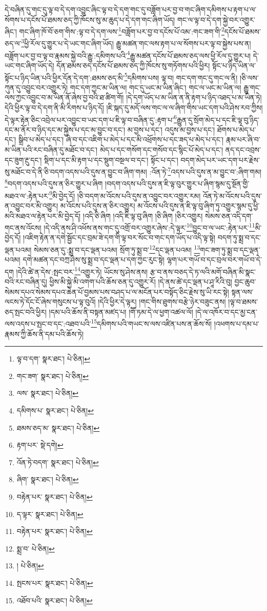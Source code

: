 དེ་བཞིན་དུ་གང་དུ་ལྟ་བ་དེ་དག་འབྱུང་ཞིང་ལྟ་བ་དེ་དག་གང་དུ་བཟློག་པར་བྱ་བ་གང་ཞིག་དམིགས་པ་རྟག་པ་ལ་སོགས་པ་དངོས་པོ་ཐམས་ཅད་ཀྱི་ཁོངས་སུ་མ་ཆུད་པ་དེ་དག་གང་ཞིག་ཡོད། གང་ལ་ལྟ་བ་དེ་དག་སྐྱེ་བར་འགྱུར་ཞིང་། གང་ཞིག་ཁོ་བོ་ཅག་གིས་:ལྟ་བ་དེ་དག་ལས་\footnote{ལྟ་བ་དག་  སྣར་ཐང་།  པེ་ཅིན། }བཟློག་པར་བྱ་བ་དངོས་པོ་འམ་:གང་ཟག་གི་\footnote{གང་ཟག་  སྣར་ཐང་།  པེ་ཅིན། }དངོས་པོ་ཐམས་ཅད་ལ་\footnote{ལས་  སྣར་ཐང་།  པེ་ཅིན། }ཕྱི་རོལ་དུ་གྱུར་པ་དེ་ཡང་གང་ཞིག་ཡོད། རྒྱུ་མཚན་གང་ལས་རྟག་པ་ལ་སོགས་པར་ལྟ་བ་སྐྱེས་པས་ན། བཟློག་པར་བྱ་བ་ལྟ་བ་རྣམས་སྐྱེ་བའི་རྒྱུ་:དམིགས་པའི་\footnote{དམིགས་པ་  སྣར་ཐང་།  པེ་ཅིན། }རྒྱུ་མཚན་དངོས་པོ་ཐམས་ཅད་ལས་ཕྱི་རོལ་དུ་གྱུར་པ། དེ་ཡང་གང་ཞིག་ཡོད་དེ། དོན་ཐམས་ཅད་དངོས་པོ་ཐམས་ཅད་ཀྱི་ཁོངས་སུ་གཏོགས་པའི་ཕྱིར། སྟོང་པ་ཉིད་ཡིན་ལ་སྟོང་པ་ཉིད་ཡིན་པའི་ཕྱིར་དོན་དེ་དག་:ཐམས་ཅད་མི་\footnote{ཐམས་ཅད་མ་  སྣར་ཐང་།  པེ་ཅིན། }དམིགས་པས། ལྟ་བ། གང་དག་གང་དུ་གང་ལ་ནི། །ཅི་ལས་ཀུན་དུ་འབྱུང་བར་འགྱུར་ཏེ། གང་དག་ཀྱང་མ་ཡིན་ལ། གང་དུ་ཡང་མ་ཡིན་ཞིང་། གང་ལ་ཡང་མ་ཡིན་ལ། རྒྱུ་གང་ལས་ཀྱང་འབྱུང་བ་མ་ཡིན་ནོ་ཞེས་བྱ་བའི་ཐ་ཚིག་གོ། །དེ་དག་ཡོད་པ་མ་ཡིན་ན་ནི་རྟག་པ་ཉིད་འཐད་པ་མ་ཡིན་ཏེ། དེའི་ཕྱིར་ལྟ་བ་དེ་དག་ནི་མི་རིགས་པ་ཉིད་དོ། །ཇི་སྐད་དུ་མདོ་ལས་གང་ལ་ལ་ཞིག་གིས་ཡང་དག་པའི་ཤེས་རབ་ཀྱིས། དེ་ལྟར་རྟེན་ཅིང་འབྲེལ་པར་འབྱུང་བ་ཡང་དག་པ་ཇི་ལྟ་བ་བཞིན་དུ་:རྟག་པ་\footnote{རྟག་པར་  སྡེ་དགེ། }རྒྱུན་དུ་སྲོག་མེད་པ་དང་ཇི་ལྟ་བུ་ཉིད་དང་མ་ནོར་བ་ཉིད་དང་མ་སྐྱེས་པ་དང་མ་བྱུང་བ་དང་། མ་བྱས་པ་དང་། འདུས་མ་བྱས་པ་དང་། ཐོགས་པ་མེད་པ་དང་། སྒྲིབ་པ་མེད་པ་དང་། ཞི་བ་དང་འཇིག་པ་མེད་པ་དང་མི་འཕྲོགས་པ་དང་ཟད་པ་མེད་པ་དང་། རྣམ་པར་ཞི་བ་མ་ཡིན་པའི་རང་བཞིན་དུ་མཐོང་བ་དང་། མེད་པ་དང་གསོག་དང་གསོབ་དང་སྙིང་པོ་མེད་པ་དང་། ནད་དང་འབྲས་དང་ཟུག་རྔུ་དང་། སྡིག་པ་དང་མི་རྟག་པ་དང་སྡུག་བསྔལ་བ་དང་། སྟོང་པ་དང་། བདག་མེད་པར་ཡང་དག་པར་རྗེས་སུ་མཐོང་བ་དེ་ནི་ཅི་བདག་འདས་པའི་དུས་ན་བྱུང་བ་ཞིག་གམ། :འོན་ཏེ་\footnote{འོན་ཏེ་བདག་  སྣར་ཐང་།  པེ་ཅིན། }འདས་པའི་དུས་ན་མ་བྱུང་བ་:ཞིག་གམ། \footnote{ཞིག་  སྣར་ཐང་།  པེ་ཅིན། }བདག་འདས་པའི་དུས་ན་ཅིར་གྱུར་པ་ཞིག །བདག་འདས་པའི་དུས་ན་ཇི་ལྟ་བུར་གྱུར་པ་ཞིག་སྙམ་དུ་སྔོན་གྱི་མཐའ་ལ་:རྟེན་པར་\footnote{བརྟེན་པར་  སྣར་ཐང་།  པེ་ཅིན། }མི་བྱེད་དོ། །ཅི་བདག་མ་འོངས་པའི་དུས་ན་འབྱུང་བར་འགྱུར་རམ། འོན་ཏེ་མ་འོངས་པའི་དུས་ན་འབྱུང་བར་མི་འགྱུར། མ་འོངས་པའི་དུས་ན་ཅིར་འགྱུར། མ་འོངས་པའི་དུས་ན་ཇི་ལྟ་བུ་ཞིག་ཏུ་འགྱུར་སྙམ་དུ་ཕྱི་མའི་མཐའ་ལ་རྟེན་པར་མི་བྱེད་དོ། །འདི་ཅི་ཞིག །འདི་ཇི་ལྟ་བུ་ཞིག །ཅི་ཞིག །ཅིར་འགྱུར། སེམས་ཅན་འདི་དག་གང་ནས་འོངས། །དེ་འདི་ནས་ཤི་འཕོས་ནས་གང་དུ་འགྲོ་བར་འགྱུར་ཞེས་:དེ་ལྟར་\footnote{ད་ལྟར་  སྣར་ཐང་།  པེ་ཅིན། }བྱུང་བ་ལ་ཡང་:རྟེན་པར་\footnote{བརྟེན་པར་  སྣར་ཐང་།  པེ་ཅིན། }མི་བྱེད་དོ། །འཇིག་རྟེན་ན་དགེ་སྦྱོང་དང་བྲམ་ཟེ་དག་གི་ལྟ་བར་སོང་བ་གང་དག་ཡོད་པ་འདི་ལྟ་སྟེ། བདག་ཏུ་སྨྲ་བ་དང་ལྡན་པའམ། སེམས་ཅན་དུ་:སྨྲ་བ་དང་ལྡན་པའམ། སྲོག་ཏུ་སྨྲ་བ་\footnote{སྨྲ་བ་  པེ་ཅིན། }དང་ལྡན་པའམ། \footnote{།    པེ་ཅིན། }གང་ཟག་ཏུ་སྨྲ་བ་དང་ལྡན་པའམ། དགེ་མཚན་དང་བཀྲ་ཤིས་སུ་སྨྲ་བ་དང་ལྡན་པ་དག་ཀྱང་རུང་སྟེ། ལྷག་པར་གཡོ་བ་དང་བྲལ་བར་གཡོ་བ་དེ་དག །དེའི་ཚེ་ན་དེས་:སྤང་བར་\footnote{སྤངས་པར་  སྣར་ཐང་།  པེ་ཅིན། }འགྱུར་ཏེ། ཡོངས་སུ་ཤེས་ནས། རྩ་བ་ནས་བཅད་དེ་ཏ་ལའི་མགོ་བཞིན་མི་སྣང་བའི་རང་བཞིན་དུ། ཕྱིས་མི་སྐྱེ་མི་འགག་པའི་ཆོས་ཅན་དུ་འགྱུར་རོ། །དེ་ནས་ཚེ་དང་ལྡན་པ་ཤཱ་རིའི་བུ། བྱང་ཆུབ་སེམས་དཔའ་སེམས་དཔའ་ཆེན་པོ་བྱམས་པས་བཤད་པ་ལ་མངོན་པར་བསྟོད་ཅིང་རྗེས་སུ་ཡི་རང་སྟེ། སྟན་ལས་ལངས་ཏེ་དོང་ངོ་ཞེས་གསུངས་པ་ལྟ་བུའོ། །དེའི་ཕྱིར་དེ་ལྟར། །གང་གིས་ཐུགས་བརྩེ་ཉེར་བཟུང་ནས། །ལྟ་བ་ཐམས་ཅད་སྤང་བའི་ཕྱིར། །དམ་པའི་ཆོས་ནི་བསྟན་མཛད་པ། །གཽ་ཏམ་དེ་ལ་ཕྱག་འཚལ་ལོ། །དེ་ལ་འཁོར་བ་དང་མྱ་ངན་ལས་འདས་པ་སྤང་བ་དང་:འཐབ་པའི་\footnote{འཐོབ་པའི་  སྣར་ཐང་།  པེ་ཅིན། }དམིགས་པའི་གཡང་ས་ལས་འཛིན་པས་ན་ཆོས་སོ། །འཕགས་པ་དམ་པ་རྣམས་ཀྱི་ཆོས་ནི་དམ་པའི་ཆོས་ཏེ། 